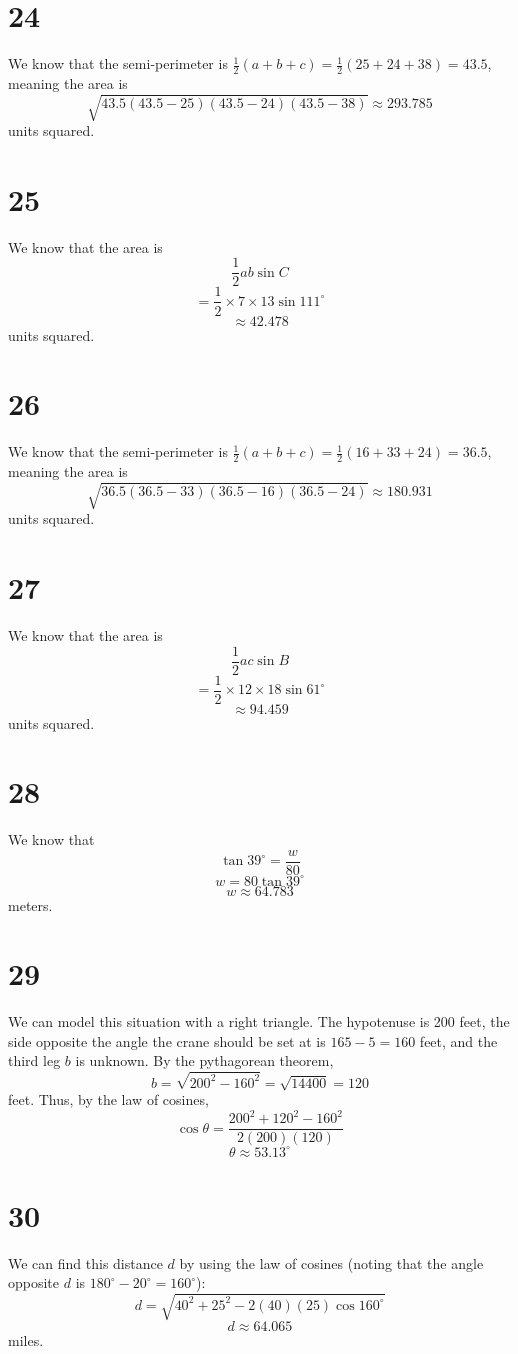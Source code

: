 \documentclass{article}
\theoremstyle{definition}
\newcommand{\?}{\stackrel{?}{=}}
\begin{document}
\section*{24}
We know that the semi-perimeter is $\frac{1}{2}(a+b+c)=\frac{1}{2}(25+24+38)=43.5$, meaning the area is
\[ \sqrt{43.5(43.5-25)(43.5-24)(43.5-38)}\approx 293.785 \] units squared.

\section*{25}
We know that the area is
\[ \frac{1}{2}ab\sin C \]
\[ =\frac{1}{2}\times 7\times 13\sin 111^\circ \]
\[ \approx 42.478 \] units squared.

\section*{26}
We know that the semi-perimeter is $\frac{1}{2}(a+b+c)=\frac{1}{2}(16+33+24)=36.5$, meaning the area is
\[ \sqrt{36.5(36.5-33)(36.5-16)(36.5-24)}\approx 180.931 \] units squared.

\section*{27}
We know that the area is
\[ \frac{1}{2}ac\sin B \]
\[ =\frac{1}{2}\times 12\times 18\sin 61^\circ \]
\[ \approx 94.459 \] units squared.

\section*{28}
We know that
\[ \tan 39^\circ=\frac{w}{80} \]
\[ w=80\tan 39^\circ \]
\[ w\approx 64.783 \] meters.

\section*{29}
We can model this situation with a right triangle. The hypotenuse is 200 feet, the side opposite the angle the crane should be set at is $165-5=160$ feet, and the third leg $b$ is unknown. 
By the pythagorean theorem, 
\[ b=\sqrt{200^2-160^2}=\sqrt{14400}=120 \] feet. Thus, by the law of cosines,
\[ \cos \theta=\frac{200^2+120^2-160^2}{2(200)(120)} \]
\[ \theta\approx 53.13^\circ \]

\section*{30}
We can find this distance $d$ by using the law of cosines (noting that the angle opposite $d$ is $180^\circ-20^\circ=160^\circ$):
\[ d=\sqrt{40^2+25^2-2(40)(25)\cos 160^\circ} \]
\[ d\approx 64.065 \] miles.
\end{document}
